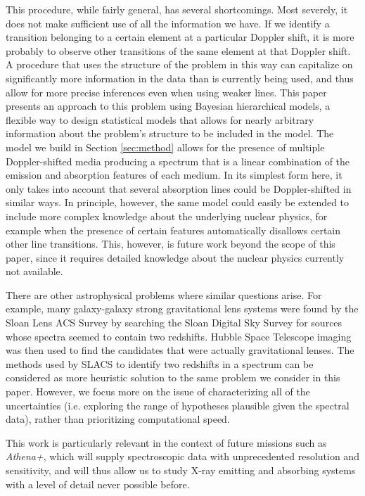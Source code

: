 \documentclass[12pt]{emulateapj}
\newcommand{\project}[1]{\textsl{#1}}
\newcommand{\athena}{\project{Athena+}}
\begin{document}
This procedure, while fairly general, has several shortcomings. Most severely, it does not make sufficient use of all the information we have. If we identify a transition belonging to a certain element at a particular Doppler shift, it is more probably to observe other transitions of the same element at that Doppler shift. A procedure that uses the structure of the problem in this way can capitalize on significantly more information in the data than is currently being used, and thus allow for more precise inferences even when using weaker lines. This paper presents an approach to this problem using Bayesian hierarchical models, a flexible way to design statistical models that allows for nearly arbitrary information about the problem's structure to be included in the model. The model we build in Section \ref{sec:method} allows for the presence of multiple Doppler-shifted media producing a spectrum that is a linear combination of the emission and absorption features of each medium. In its simplest form here, it only takes into account that several absorption lines could be Doppler-shifted in similar ways. In principle, however, the same model could easily be extended to include more complex knowledge about the underlying nuclear physics, for example when the presence of certain features automatically disallows certain other line transitions. This, however, is future work beyond the scope of this paper, since it requires detailed knowledge about the nuclear physics currently not available. 

There are other astrophysical problems where similar questions arise. For
example, many galaxy-galaxy strong gravitational lens systems were
found by the Sloan Lens ACS Survey \citep[SLACS;][]{slacs0, slacs1} by searching
the Sloan Digital Sky Survey for sources whose spectra seemed to contain two
redshifts. Hubble Space Telescope imaging was then used to find the candidates
that were actually gravitational lenses.
The methods used by SLACS to identify two redshifts in a spectrum can be
considered as more heuristic solution to the same problem we consider in this
paper. However, we focus more on the issue of characterizing all of the
uncertainties (i.e. exploring the range of hypotheses plausible given the
spectral data), rather than prioritizing computational speed.

This work is particularly relevant in the context of future missions such as \athena, which will supply spectroscopic data with unprecedented resolution and sensitivity, and will thus allow us to study X-ray emitting and absorbing systems with a level of detail never possible before.
\end{document}
